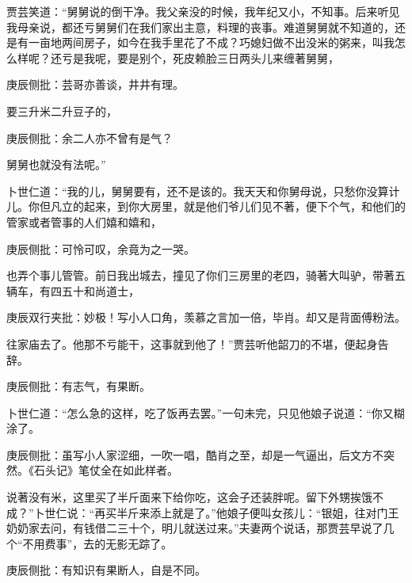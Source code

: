 \begin{parag}


    贾芸笑道：“舅舅说的倒干净。我父亲没的时候，我年纪又小，不知事。后来听见我母亲说，都还亏舅舅们在我们家出主意，料理的丧事。难道舅舅就不知道的，还是有一亩地两间房子，如今在我手里花了不成？巧媳妇做不出没米的粥来，叫我怎么样呢？还亏是我呢，要是别个，死皮赖脸三日两头儿来缠著舅舅，\begin{note}庚辰侧批：芸哥亦善谈，井井有理。\end{note}要三升米二升豆子的，\begin{note}庚辰侧批：余二人亦不曾有是气？\end{note}舅舅也就没有法呢。”
\end{parag}


\begin{parag}

    卜世仁道：“我的儿，舅舅要有，还不是该的。我天天和你舅母说，只愁你没算计儿。你但凡立的起来，到你大房里，就是他们爷儿们见不著，便下个气，和他们的管家或者管事的人们嬉和嬉和，\begin{note}庚辰侧批：可怜可叹，余竟为之一哭。\end{note}也弄个事儿管管。前日我出城去，撞见了你们三房里的老四，骑著大叫驴，带著五辆车，有四五十和尚道士，\begin{note}庚辰双行夹批：妙极！写小人口角，羡慕之言加一倍，毕肖。却又是背面傅粉法。\end{note}往家庙去了。他那不亏能干，这事就到他了！”贾芸听他韶刀的不堪，便起身告辞。\begin{note}庚辰侧批：有志气，有果断。\end{note}卜世仁道：“怎么急的这样，吃了饭再去罢。”一句未完，只见他娘子说道：“你又糊涂了。\begin{note}庚辰侧批：虽写小人家涩细，一吹一唱，酷肖之至，却是一气逼出，后文方不突然。《石头记》笔仗全在如此样者。\end{note}说著没有米，这里买了半斤面来下给你吃，这会子还装胖呢。留下外甥挨饿不成？”卜世仁说：“再买半斤来添上就是了。”他娘子便叫女孩儿：“银姐，往对门王奶奶家去问，有钱借二三十个，明儿就送过来。”夫妻两个说话，那贾芸早说了几个“不用费事”，去的无影无踪了。\begin{note}庚辰侧批：有知识有果断人，自是不同。\end{note}
\end{parag}


